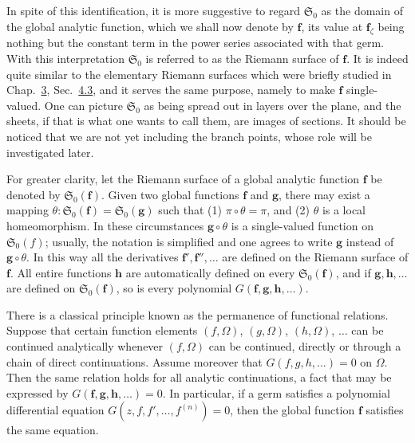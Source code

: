In spite of this identification, it is more suggestive to regard $\mathfrak{S}_{0}$ as the domain of the global analytic function, which we shall now denote by $\mathbf{f}$, its value at $\mathbf{f}_{\zeta}$ being nothing but the constant term in the power series associated with that germ. With this interpretation $\mathfrak{S}_{0}$ is referred to as the Riemann surface of $\mathbf{f}$. It is indeed quite similar to the elementary Riemann surfaces which were briefly studied in Chap.~\hyperref[chap:3]{3}, Sec.~\hyperref[sec:3.4.3]{4.3}, and it serves the same purpose, namely to make $\mathbf{f}$ single-valued. One can picture $\mathfrak{S}_{0}$ as being spread out in layers over the plane, and the sheets, if that is what one wants to call them, are images of sections. It should be noticed that we are not yet including the branch points, whose role will be investigated later.

For greater clarity, let the Riemann surface of a global analytic function $\mathbf{f}$ be denoted by $\mathfrak{S}_0(\mathbf{f})$. Given two global functions $\mathbf{f}$ and $\mathbf{g}$, there may exist a mapping $\theta: \mathfrak{S}_0(\mathbf{f}) = \mathfrak{S}_0(\mathbf{g})$ such that (1) $\pi \circ \theta = \pi$, and (2) $\theta$ is a local homeomorphism. In these circumstances $\mathbf{g} \circ \theta$ is a single-valued function on $\mathfrak{S}_0(f)$; usually, the notation is simplified and one agrees to write $\mathbf{g}$ instead of $\mathbf{g} \circ \theta$. In this way all the derivatives $\mathbf{f}', \mathbf{f}'', \ldots$ are defined on the Riemann surface of $\mathbf{f}$. All entire functions $\mathbf{h}$ are automatically defined on every $\mathfrak{S}_0(\mathbf{f})$, and if $\mathbf{g}, \mathbf{h}, \ldots$ are defined on $\mathfrak{S}_0(\mathbf{f})$, so is every polynomial $G(\mathbf{f}, \mathbf{g}, \mathbf{h}, \ldots)$.

There is a classical principle known as the permanence of functional relations. Suppose that certain function elements $(f,\Omega)$, $(g,\Omega)$, $(h,\Omega)$, $\ldots$ can be continued analytically whenever $(f,\Omega)$ can be continued, directly or through a chain of direct continuations. Assume moreover that $G(f,g,h,\ldots)=0$ on $\Omega$. Then the same relation holds for all analytic continuations, a fact that may be expressed by $G(\mathbf{f},\mathbf{g},\mathbf{h},\ldots)=0$. In particular, if a germ satisfies a polynomial differential equation $G(z,f,f',\ldots,f^{(n)})=0$, then the global function $\mathbf{f}$ satisfies the same equation.


